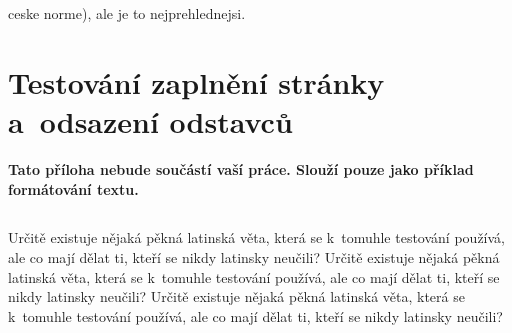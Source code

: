 \documentclass[11pt,twoside,a4paper]{book}
\begin{document}

%




%
{
\def\CS{$\cal C\kern-0.1667em\lower.5ex\hbox{$\cal S$}\kern-0.075em $}

}

%
ceske norme), ale je to nejprehlednejsi.

\appendix

\chapter{Testování zaplnění stránky a~odsazení odstavců}
\textbf{\large Tato příloha nebude součástí vaší práce. 
Slouží pouze jako příklad formátování textu.}

\section*{}
Určitě existuje nějaká pěkná latinská věta, která se k~tomuhle testování používá, ale co mají dělat ti, kteří se nikdy
latinsky neučili? Určitě existuje nějaká pěkná latinská věta, která se k~tomuhle testování používá, ale co mají dělat
ti, kteří se nikdy latinsky neučili? Určitě existuje nějaká pěkná latinská věta, která se k~tomuhle testování používá,
ale co mají dělat ti, kteří se nikdy latinsky neučili?
\end{document}
